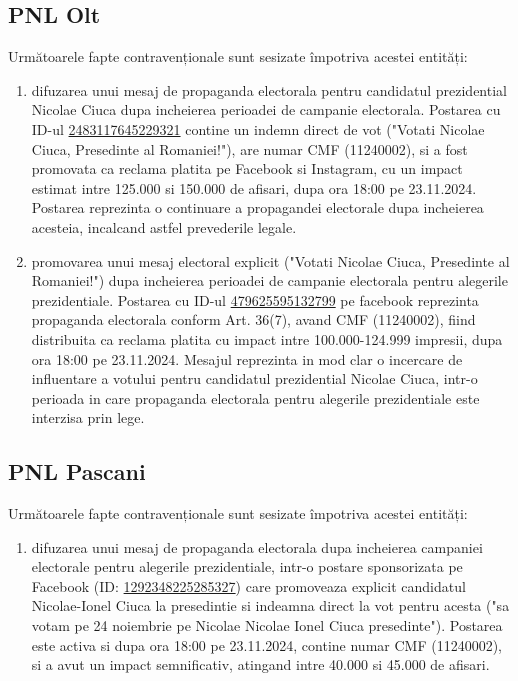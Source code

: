 \documentclass[a4paper,12pt]{article}
\begin{document}
\subsection{PNL Olt}
Următoarele fapte contravenționale sunt sesizate împotriva acestei entități:

\begin{enumerate}[leftmargin=*, label=\arabic*.)]
    \item difuzarea unui mesaj de propaganda electorala pentru candidatul prezidential Nicolae Ciuca dupa incheierea perioadei de campanie electorala. Postarea cu ID-ul \href{https://www.facebook.com/ads/library/?id=2483117645229321}{2483117645229321} contine un indemn direct de vot ("Votati Nicolae Ciuca, Presedinte al Romaniei!"), are numar CMF (11240002), si a fost promovata ca reclama platita pe Facebook si Instagram, cu un impact estimat intre 125.000 si 150.000 de afisari, dupa ora 18:00 pe 23.11.2024. Postarea reprezinta o continuare a propagandei electorale dupa incheierea acesteia, incalcand astfel prevederile legale.
    \item promovarea unui mesaj electoral explicit ("Votati Nicolae Ciuca, Presedinte al Romaniei!") dupa incheierea perioadei de campanie electorala pentru alegerile prezidentiale. Postarea cu ID-ul \href{https://www.facebook.com/ads/library/?id=479625595132799}{479625595132799} pe facebook reprezinta propaganda electorala conform Art. 36(7), avand CMF (11240002), fiind distribuita ca reclama platita cu impact intre 100.000-124.999 impresii, dupa ora 18:00 pe 23.11.2024. Mesajul reprezinta in mod clar o incercare de influentare a votului pentru candidatul prezidential Nicolae Ciuca, intr-o perioada in care propaganda electorala pentru alegerile prezidentiale este interzisa prin lege.
\end{enumerate}

\vspace{0.5cm}

\subsection{PNL Pascani}
Următoarele fapte contravenționale sunt sesizate împotriva acestei entități:

\begin{enumerate}[leftmargin=*, label=\arabic*.)]
    \item difuzarea unui mesaj de propaganda electorala dupa incheierea campaniei electorale pentru alegerile prezidentiale, intr-o postare sponsorizata pe Facebook (ID: \href{https://www.facebook.com/ads/library/?id=1292348225285327}{1292348225285327}) care promoveaza explicit candidatul Nicolae-Ionel Ciuca la presedintie si indeamna direct la vot pentru acesta ("sa votam pe 24 noiembrie pe Nicolae Nicolae Ionel Ciuca presedinte"). Postarea este activa si dupa ora 18:00 pe 23.11.2024, contine numar CMF (11240002), si a avut un impact semnificativ, atingand intre 40.000 si 45.000 de afisari.
\end{enumerate}
\end{document}
